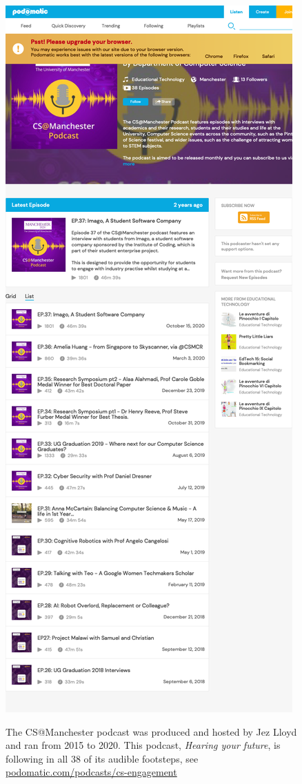 \documentclass[
]{book}
\begin{document}
\begin{figure}
\href{https://www.podomatic.com/podcasts/cs-engagement}{\includegraphics[width=1\linewidth]{cdyf_files/figure-latex/jez-fig-1} }\caption{The CS@Manchester podcast was produced and hosted by Jez Lloyd and ran from 2015 to 2020. This podcast, \emph{Hearing your future}, is following in all 38 of its audible footsteps, see \href{https://www.podomatic.com/podcasts/cs-engagement}{podomatic.com/podcasts/cs-engagement}}\label{fig:jez-fig}
\end{figure}
\end{document}
